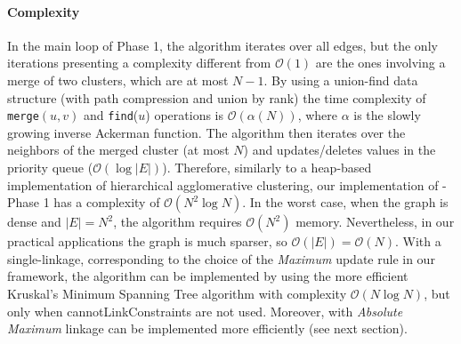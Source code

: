 \paragraph*{Complexity} 
In the main loop of Phase 1, the algorithm iterates over all edges, but the only iterations presenting a complexity different from $\mathcal{O}(1)$ are the ones involving a merge of two clusters, which are at most $N-1$. By using a union-find data structure (with path compression and union by rank) the time complexity of \texttt{merge}$(u, v)$ and \texttt{find}($u$) operations is $\mathcal{O}(\alpha(N))$, where $\alpha$ is the slowly growing inverse Ackerman function. The algorithm then iterates over the neighbors of the merged cluster (at most $N$) and updates/deletes values in the priority queue ($\mathcal{O}(\log |E|)$). 
Therefore, 
similarly to a heap-based implementation of hierarchical agglomerative clustering, our implementation of \algname{} - Phase 1 has a complexity of $\mathcal{O}(N^2 \log N)$. In the worst case, when the graph is dense and $|E|=N^2$, the algorithm requires $\mathcal{O}(N^2)$ memory. Nevertheless, in our practical applications the graph is much sparser, so $\mathcal{O}(|E|)=\mathcal{O}(N)$. 
With a single-linkage, corresponding to the choice of the \emph{Maximum} update rule in our framework, the algorithm can be implemented by using the more efficient Kruskal's Minimum Spanning Tree algorithm with complexity $\mathcal{O}(N \log N)$, but only when cannotLinkConstraints are not used. 
Moreover, \algname{} with \emph{Absolute Maximum} linkage can be implemented more efficiently (see next section). %





